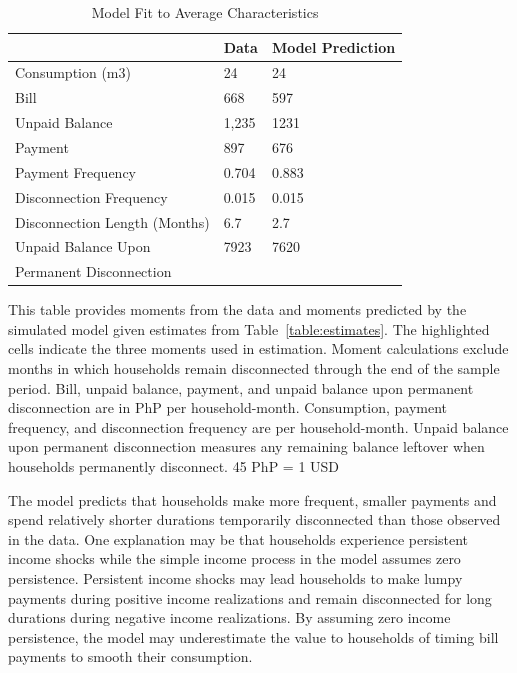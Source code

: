 \documentclass[12pt]{article}
\begin{document}
\begin{table}[H]
\centering
\caption{Model Fit to Average Characteristics}\label{table:fit}
\begin{threeparttable}
\begin{tabular}{@{}l*{1}{KK}@{}}
\toprule
 & Data & Model Prediction \\
\midrule
Consumption (m3) & 24 & 24  \\
Bill &  668 & 597  \\
Unpaid Balance &  1,235  &  1231  \\
Payment &  897 &  676 \\
Payment Frequency &  0.704 &  0.883  \\
Disconnection Frequency &  0.015  &  0.015 \\
Disconnection Length (Months) & 6.7 & 2.7  \\
Unpaid Balance Upon &  7923 &  7620  \\[-.5em]
Permanent Disconnection \\
\bottomrule
\end{tabular}
\begin{tablenotes}
\item 
\footnotesize
This table provides moments from the data and moments predicted by the simulated model given estimates from Table~\ref{table:estimates}.  The highlighted cells indicate the three moments used in estimation.  Moment calculations exclude months in which households remain disconnected through the end of the sample period.  Bill, unpaid balance, payment, and unpaid balance upon permanent disconnection are in PhP per household-month.  Consumption, payment frequency, and disconnection frequency are per household-month.  Unpaid balance upon permanent disconnection measures any remaining balance leftover when households permanently disconnect.    45 PhP = 1 USD
\end{tablenotes}
\end{threeparttable}

\end{table}

The model predicts that households make more frequent, smaller payments and spend relatively shorter durations temporarily disconnected than those observed in the data.  One explanation may be that households experience persistent income shocks while the simple income process in the model assumes zero persistence.  Persistent income shocks may lead households to make lumpy payments during positive income realizations and remain disconnected for long durations during negative income realizations.  By assuming zero income persistence, the model may underestimate the value to households of timing bill payments to smooth their consumption.  
\end{document}
